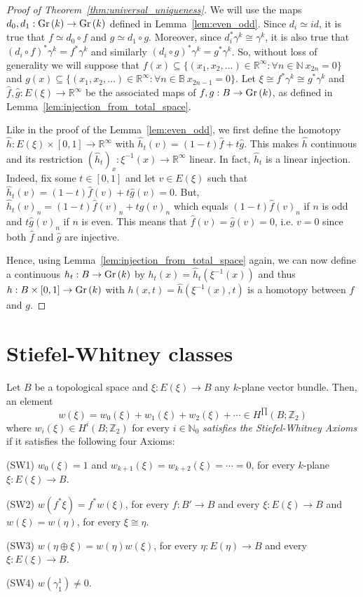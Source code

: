 \begin{proof}[Proof of Theorem~\ref{thm:universal_uniqueness}] We will use the maps $d_0,d_1:\Gr{k}\to\Gr{k}$ defined in Lemma~\ref{lem:even_odd}. Since $d_i\simeq id$, it is true that $f\simeq d_0\circ f$ and $g\simeq d_1\circ g$. Moreover, since $d_i^*\gamma^k\cong\gamma^k$, it is also true that $(d_i\circ f)^*\gamma^k=f^*\gamma^k$ and similarly $(d_i\circ g)^*\gamma^k=g^*\gamma^k$. So, without loss of generality we will suppose that $f(x)\subseteq\{(x_1,x_2,\ldots)\in\mathbb{R}^{\infty}:\forall n\in\mathbb{N}\ x_{2n}=0\}$ and $g(x)\subseteq\{(x_1,x_2,\ldots)\in\mathbb{R}^{\infty}:\forall n\in\mathbb{B}\ x_{2n-1}=0\}$. Let $\xi\cong f^*\gamma^k\cong g^*\gamma^k$ and $\hat{f},\hat{g}:E(\xi)\to\mathbb{R}^{\infty}$ be the associated maps of $f,g:B\to\Gr{k}$, as defined in Lemma~\ref{lem:injection_from_total_space}.

Like in the proof of the Lemma~\ref{lem:even_odd}, we first define the homotopy $\hat{h}:E(\xi)\times[0,1]\to\mathbb{R}^{\infty}$ with $\hat{h}_t(v)=(1-t)\hat{f}+t\hat{g}$. This makes $\hat{h}$ continuous and its restriction $(\hat{h}_t)_x:\xi^{-1}(x)\to\mathbb{R}^{\infty}$ linear. In fact, $\hat{h}_t$ is a linear injection. Indeed, fix some $t\in[0,1]$ and let $v\in E(\xi)$ such that $\hat{h}_t(v)=(1-t)\hat{f}(v)+t\hat{g}(v)=0$. But, $\hat{h}_t(v)_n=(1-t)\hat{f}(v)_n+t\hat{g}(v)_n$ which equals $(1-t)\hat{f}(v)_n$ if $n$ is odd and $t\hat{g}(v)_n$ if $n$ is even. This means that $\hat{f}(v)=\hat{g}(v)=0$, i.e. $v=0$ since both $\hat{f}$ and $\hat{g}$ are injective.

Hence, using Lemma~\ref{lem:injection_from_total_space} again, we can now define a continuous $h_t:B\to\Gr{k}$ by $h_t(x)=\hat{h}_t(\xi^{-1}(x))$ and thus $h:B\times[0,1]\to\Gr{k}$ with $h(x,t)=\hat{h}(\xi^{-1}(x),t)$ is a homotopy between $f$ and $g$.
\end{proof}

\section{Stiefel-Whitney classes}
\begin{axioms} Let $B$ be a topological space and $\xi:E(\xi)\to B$ any $k$-plane vector bundle. Then, an element
\[w(\xi)=w_0(\xi)+w_1(\xi)+w_2(\xi)+\cdots\in H^{\prod}(B;\mathbb{Z}_2)\]
where $w_i(\xi)\in H^i(B;\mathbb{Z}_2)$ for every $i\in\mathbb{N}_0$ \emph{satisfies the Stiefel-Whitney Axioms} if it satisfies the following four Axioms:
\begin{b_item}
\item[(SW1)] $w_0(\xi)=1$ and $w_{k+1}(\xi)=w_{k+2}(\xi)=\cdots=0$, for every $k$-plane $\xi:E(\xi)\to B$.
\item[(SW2)] $w(f^*\xi)=f^*w(\xi)$, for every $f:B'\to B$ and every $\xi:E(\xi)\to B$ and\\[0.2em]
$w(\xi)=w(\eta)$, for every $\xi\cong\eta$.
\item[(SW3)] $w(\eta\oplus\xi)=w(\eta)w(\xi)$, for every $\eta:E(\eta)\to B$ and every $\xi:E(\xi)\to B$.
\item[(SW4)] $w(\gamma_1^1)\neq0$.
\end{b_item}
\end{axioms}

